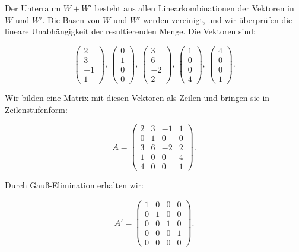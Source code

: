 \documentclass[11pt]{article}
\begin{document}
Der Unterraum \( W + W' \) besteht aus allen Linearkombinationen der Vektoren in \( W \) und \( W' \). Die Basen von \( W \) und \( W' \) werden vereinigt, und wir überprüfen die lineare Unabhängigkeit der resultierenden Menge. Die Vektoren sind:

\[
\begin{pmatrix} 2 \\ 3 \\ -1 \\ 1 \end{pmatrix}, \,
\begin{pmatrix} 0 \\ 1 \\ 0 \\ 0 \end{pmatrix}, \,
\begin{pmatrix} 3 \\ 6 \\ -2 \\ 2 \end{pmatrix}, \,
\begin{pmatrix} 1 \\ 0 \\ 0 \\ 4 \end{pmatrix}, \,
\begin{pmatrix} 4 \\ 0 \\ 0 \\ 1 \end{pmatrix}.
\]

Wir bilden eine Matrix mit diesen Vektoren als Zeilen und bringen sie in Zeilenstufenform:

\[
A = \begin{pmatrix}
2 & 3 & -1 & 1 \\
0 & 1 & 0 & 0 \\
3 & 6 & -2 & 2 \\
1 & 0 & 0 & 4 \\
4 & 0 & 0 & 1
\end{pmatrix}.
\]

Durch Gauß-Elimination erhalten wir:

\[
A' = \begin{pmatrix}
1 & 0 & 0 & 0 \\
0 & 1 & 0 & 0 \\
0 & 0 & 1 & 0 \\
0 & 0 & 0 & 1 \\
0 & 0 & 0 & 0
\end{pmatrix}.
\]
\end{document}
